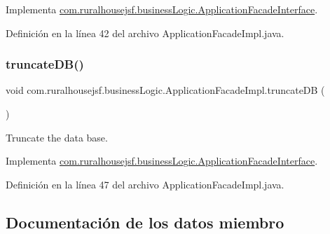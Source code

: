 Implementa \mbox{\hyperlink{interfacecom_1_1ruralhousejsf_1_1business_logic_1_1_application_facade_interface_a8bb95aa007a4d95b32ed838ae40406c0}{com.\+ruralhousejsf.\+business\+Logic.\+Application\+Facade\+Interface}}.



Definición en la línea 42 del archivo Application\+Facade\+Impl.\+java.

\mbox{\label{classcom_1_1ruralhousejsf_1_1business_logic_1_1_application_facade_impl_a5fe9f44c95b3459fb8999c26e5b934cb}} 
\subsubsection{\texorpdfstring{truncateDB()}{truncateDB()}}
{\footnotesize\ttfamily void com.\+ruralhousejsf.\+business\+Logic.\+Application\+Facade\+Impl.\+truncate\+DB (\begin{DoxyParamCaption}{ }\end{DoxyParamCaption})}

Truncate the data base. 

Implementa \mbox{\hyperlink{interfacecom_1_1ruralhousejsf_1_1business_logic_1_1_application_facade_interface_aeb85aa3c5dd08bc15e08cc0d4c36882e}{com.\+ruralhousejsf.\+business\+Logic.\+Application\+Facade\+Interface}}.



Definición en la línea 47 del archivo Application\+Facade\+Impl.\+java.



\subsection{Documentación de los datos miembro}
\mbox{\label{classcom_1_1ruralhousejsf_1_1business_logic_1_1_application_facade_impl_a96ac80fe606a4649e5fbbbd24935690a}} 
